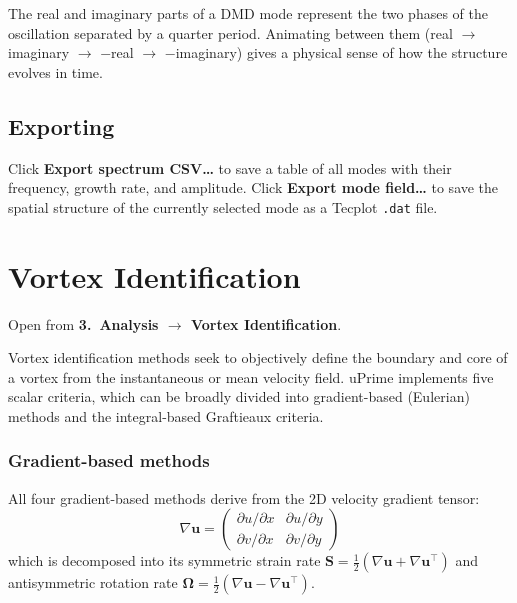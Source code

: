 \documentclass[11pt, a4paper]{report}
\newcommand{\uipth}[1]{\textbf{\textcolor{upblue}{#1}}}
\begin{document}
\begin{tipbox}
The real and imaginary parts of a DMD mode represent the two phases of the oscillation separated by a quarter period. Animating between them (real $\to$ imaginary $\to$ $-$real $\to$ $-$imaginary) gives a physical sense of how the structure evolves in time.
\end{tipbox}

\section{Exporting}

Click \uipth{Export spectrum CSV\ldots} to save a table of all modes with their frequency, growth rate, and amplitude. Click \uipth{Export mode field\ldots} to save the spatial structure of the currently selected mode as a Tecplot \texttt{.dat} file.

\chapter{Vortex Identification}
\label{ch:vortex}

Open from \uipth{3.\ Analysis $\to$ Vortex Identification}.

Vortex identification methods seek to objectively define the boundary and core of a vortex from the instantaneous or mean velocity field. uPrime implements five scalar criteria, which can be broadly divided into gradient-based (Eulerian) methods and the integral-based Graftieaux criteria.

\subsection*{Gradient-based methods}

All four gradient-based methods derive from the 2D velocity gradient tensor:
\[
\nabla \mathbf{u} = \begin{pmatrix} \partial u/\partial x & \partial u/\partial y \\ \partial v/\partial x & \partial v/\partial y \end{pmatrix}
\]
which is decomposed into its symmetric strain rate $\mathbf{S} = \tfrac{1}{2}(\nabla\mathbf{u} + \nabla\mathbf{u}^\top)$ and antisymmetric rotation rate $\boldsymbol{\Omega} = \tfrac{1}{2}(\nabla\mathbf{u} - \nabla\mathbf{u}^\top)$.
\end{document}
